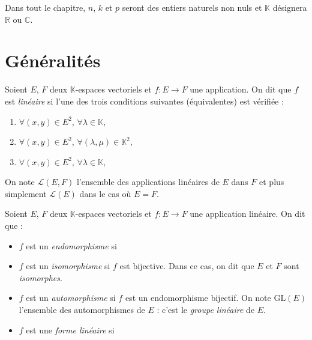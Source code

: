 \documentclass[french,11pt,twoside]{VcCours}
\begin{document}

\tableofcontents
\separationTitre

Dans tout le chapitre, $n$, $k$ et $p$ seront des entiers naturels non nuls et $\mathbb{K}$ désignera $\mathbb{R}$ ou $\mathbb{C}$.
 
 \section{Généralités}
 
 \begin{Definition}{} Soient $E$, $F$ deux $\mathbb{K}$-espaces vectoriels et $f : E \rightarrow F$ une application. On dit que $f$ est \emph{linéaire} si l'une des trois conditions suivantes (équivalentes) est vérifiée :

\begin{enumerate}
\item $\forall (x,y) \in E^2$, $\forall \lambda \in \mathbb{K}$, \phantom{$f(x+y) = f(x)+f(y)$ et $f(\lambda x) = \lambda f(x)$.}
\item $\forall (x,y) \in E^2$, $\forall (\lambda,\mu) \in \mathbb{K}^2$, \phantom{$f(\lambda x + \mu y) = \lambda f(x) + \mu f(y)$. }
\item $\forall (x,y) \in E^2$, $\forall \lambda \in \mathbb{K}$, \phantom{$f(\lambda x + y) = \lambda f(x) +  f(y)$. }
\end{enumerate}
On note $\mathcal{L}(E,F)$ l'ensemble des applications linéaires de $E$ dans $F$ et plus simplement $\mathcal{L}(E)$ dans le cas où $E=F$.
\end{Definition}

\begin{Definition}{} Soient $E$, $F$ deux $\mathbb{K}$-espaces vectoriels et $f : E \rightarrow F$ une application linéaire. On dit que :

\begin{itemize}
\item $f$ est un \emph{endomorphisme} si \phantom{$E=F$.}
\item $f$ est un \emph{isomorphisme} si $f$ est bijective. Dans ce cas, on dit que $E$ et $F$ sont \emph{isomorphes}.
\item $f$ est un \emph{automorphisme} si $f$ est un endomorphisme bijectif. On note $\textrm{GL}(E)$ l'ensemble des automorphismes de $E$ : c'est le \emph{groupe linéaire} de $E$.
\item $f$ est une \emph{forme linéaire} si 
\end{itemize}
\end{Definition}
\end{document}
